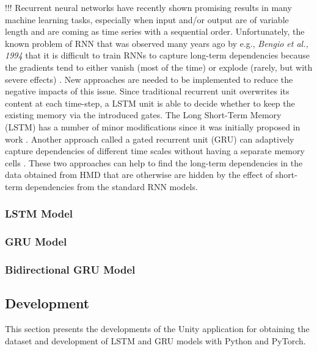 !!! 
Recurrent neural networks have recently shown promising results in many machine learning tasks, especially when input and/or output are of variable length and are coming as time series with a sequential order. Unfortunately, the known problem of RNN that was observed many years ago by e.g., \textit{Bengio et al., 1994} that it is difficult to train RNNs to capture long-term dependencies because the gradients tend to either vanish (most of the time) or explode (rarely, but with severe effects) \cite{rnn_difficults}. New approaches are needed to be implemented to reduce the negative impacts of this issue. Since traditional recurrent unit overwrites its content at each time-step, a LSTM unit is able to decide whether to keep the existing memory via the introduced gates. The Long Short-Term Memory (LSTM) has a number of minor modifications \cite{empirical_evaluation} since it was initially proposed in work \cite{lstm_orig}. Another approach called a gated recurrent unit (GRU) can adaptively capture dependencies of different time scales without having a separate memory cells \cite{empirical_evaluation}. These two approaches can help to find the long-term dependencies in the data obtained from HMD that are otherwise are hidden by the effect of short-term dependencies from the standard RNN models.\\

\subsubsection{LSTM Model}
\label{sec:impl:model:arch:lstm}

\subsubsection{GRU Model}
\label{sec:impl:model:arch:gru}

\subsubsection{Bidirectional GRU Model}
\label{sec:impl:model:arch:bi-gru}


\subsection{Development}
\label{sec:impl:model:dev}
This section presents the developments of the Unity application for obtaining the dataset and development of LSTM and GRU models with Python and PyTorch. 

